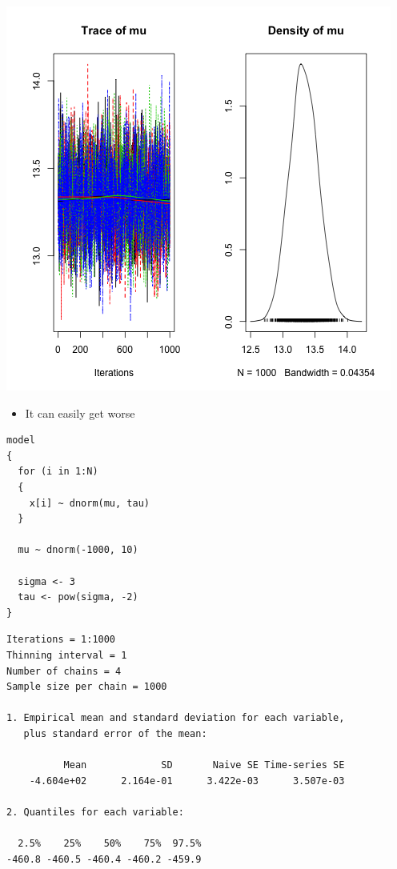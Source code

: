 \documentclass{beamer}
\begin{document}
\begin{frame}[fragile]
  \begin{center}
    \includegraphics[scale = 0.4]{../graphs/normal/plot2.png}
  \end{center}
\end{frame}

\begin{frame}
  \begin{itemize}
    \item{It can easily get worse}
  \end{itemize}
\end{frame}

\begin{frame}[fragile]
  \begin{verbatim}
model
{
  for (i in 1:N)
  {
    x[i] ~ dnorm(mu, tau)
  }
  
  mu ~ dnorm(-1000, 10)
  
  sigma <- 3
  tau <- pow(sigma, -2)
}
  \end{verbatim}
\end{frame}

\begin{frame}[fragile]
  \begin{verbatim}
Iterations = 1:1000
Thinning interval = 1 
Number of chains = 4 
Sample size per chain = 1000 

1. Empirical mean and standard deviation for each variable,
   plus standard error of the mean:

          Mean             SD       Naive SE Time-series SE 
    -4.604e+02      2.164e-01      3.422e-03      3.507e-03 

2. Quantiles for each variable:

  2.5%    25%    50%    75%  97.5% 
-460.8 -460.5 -460.4 -460.2 -459.9 
  \end{verbatim}
\end{frame}
\end{document}

